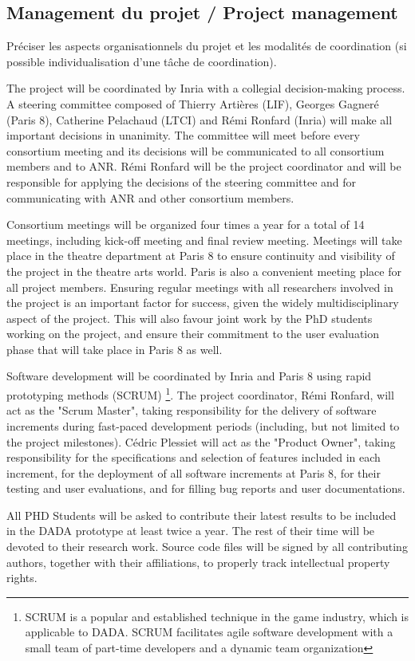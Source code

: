 
\subsection{Management du projet / Project management}
\begin{xcomment}  
Pr\'eciser les aspects organisationnels du projet et les modalit\'es de coordination (si possible individualisation d'une tâche de coordination).
\end{xcomment}


The project will be coordinated by Inria with a collegial decision-making process. A steering committee composed of Thierry Arti\`eres (LIF), 
Georges Gagner\'e (Paris 8), Catherine Pelachaud (LTCI) and R\'emi Ronfard (Inria) will make all important decisions  in unanimity. 
The committee will meet before every consortium meeting and its decisions will be  communicated to all consortium members and to ANR. 
R\'emi Ronfard will be the project coordinator and will be responsible for applying the decisions of the steering committee and for communicating 
with ANR and other consortium members. 


Consortium meetings will be organized four times a year for a total of 14 meetings, including kick-off meeting and final review meeting. 
Meetings will take place in the theatre department at Paris 8 to ensure continuity and visibility of the project in the theatre arts world. Paris is also 
a convenient meeting place for all project members. Ensuring regular meetings with all researchers involved in the project is an important
factor for success, given the widely multidisciplinary aspect of the project. This will also favour joint work by the PhD students working
on the project, and ensure their commitment to the user evaluation phase that will take place in Paris 8 as well. 

Software development will be coordinated by Inria and Paris 8 using rapid prototyping methods (SCRUM) \footnote{SCRUM is a popular
and established technique in the game industry, which is applicable to DADA. SCRUM facilitates agile software development
with a small team of part-time developers and a dynamic team organization}. The project coordinator, R\'emi Ronfard,
will act as the "Scrum Master", taking responsibility for the delivery of software increments during fast-paced development periods (including, but not limited to 
the project milestones). C\'edric Plessiet will act as the "Product Owner", taking responsibility for the specifications and selection of features included in each increment,
for the deployment of all software increments at Paris 8, for their testing and user evaluations, and for filling bug reports and user documentations.

All PHD Students will be asked to contribute their latest results to be included in the DADA prototype at least twice a year. 
The rest of their time will be devoted to their research work. Source code files will be signed by all contributing authors, 
together with their affiliations, to properly  track intellectual property rights.



\endinput

